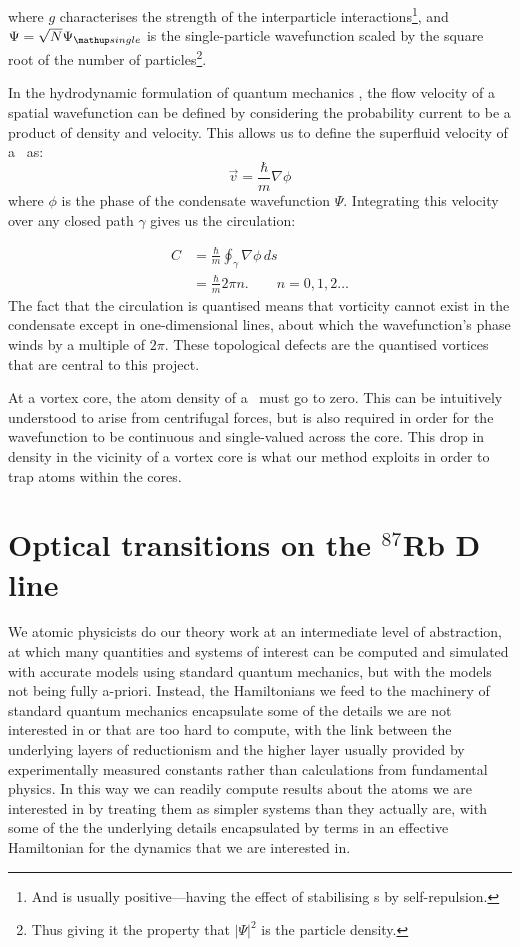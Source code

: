 where $g$ characterises the strength of the interparticle interactions\footnote{And is usually positive---having the effect of stabilising \bec s by self-repulsion.}, and $\Psi = \sqrt{N}\Psi_\up{single}$ is the single-particle wavefunction scaled by the square root of the number of particles\footnote{Thus giving it the property that $|\Psi|^2$ is the particle density.}.

In the hydrodynamic formulation of quantum mechanics \cite{madelung_quantentheorie_1927}, the flow velocity of a spatial wavefunction can be defined by considering the probability current to be a product of density and velocity. This allows us to define the superfluid velocity of a \bec\ as:
\begin{equation}
\vec v = \frac\hbar m \nabla\phi
\end{equation}
where $\phi$ is the phase of the condensate wavefunction $\Psi$. Integrating this velocity over any closed path $\gamma$ gives us the circulation:

\begin{align}
C &= \frac\hbar m\oint_\gamma\nabla\phi\,ds\\
  &= \frac\hbar m 2\pi n.\qquad n=0,1,2\dots
\end{align}
The fact that the circulation is quantised means that vorticity cannot exist in the condensate except in one-dimensional lines, about which the wavefunction's phase winds by a multiple of $2\pi$. These topological defects are the quantised vortices that are central to this project.

At a vortex core, the atom density of a \bec\ must go to zero. This can be intuitively understood to arise from centrifugal forces, but is also required in order for the wavefunction to be continuous and single-valued across the core. This drop in density in the vicinity of a vortex core is what our method exploits in order to trap atoms within the cores.

\section{Optical transitions on the $^{87}$Rb D line}

We atomic physicists do our theory work at an intermediate level of abstraction, at which many quantities and systems of interest can be computed and simulated with accurate models using standard quantum mechanics, but with the models not being fully a-priori. Instead, the Hamiltonians we feed to the machinery of standard quantum mechanics encapsulate some of the details we are not interested in or that are too hard to compute, with the link between the underlying layers of reductionism and the higher layer usually provided by experimentally measured constants rather than calculations from fundamental physics. In this way we can readily compute results about the atoms we are interested in by treating them as simpler systems than they actually are, with some of the the underlying details encapsulated by terms in an effective Hamiltonian for the dynamics that we are interested in.


